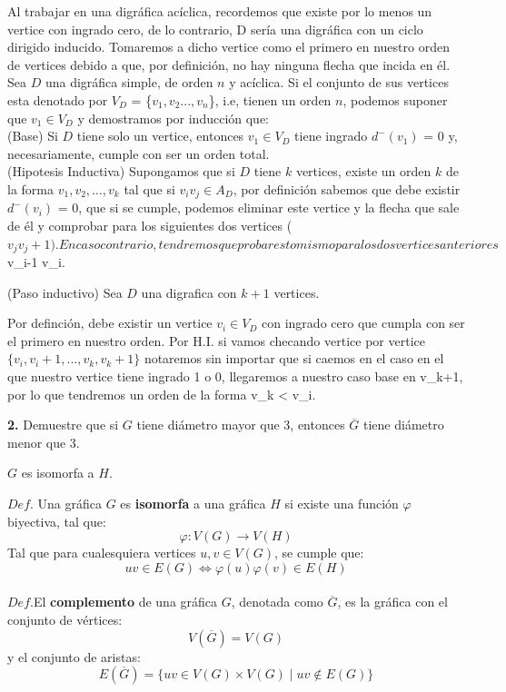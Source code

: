 \documentclass[12pt]{article}
\begin{document}
Al trabajar en una digráfica acíclica, recordemos que existe por lo menos un vertice con ingrado cero, 
de lo contrario, D sería una digráfica con un ciclo dirigido inducido. Tomaremos a dicho vertice como el primero en nuestro orden 
de vertices debido a que, por definición, no hay ninguna flecha que incida en él. \\

Sea $D$ una digráfica simple, de orden $n$ y acíclica. Si el conjunto de sus vertices esta denotado 
por $V_D$  = \{$v_1, v_2  . . . , v_n$\}, i.e, tienen un orden $n$, podemos suponer que  $v_1 \in V_D $
 y demostramos por inducción que:\\

(Base) Si $D$ tiene solo un vertice, entonces $v_1 \in V_D$ tiene ingrado $d^-(v_1)$ = 0 y, necesariamente, cumple con ser un orden total.\\

(Hipotesis Inductiva) Supongamos que si $D$ tiene $k$ vertices, existe un orden $k$ de la forma 
$v_1, v_2, \dots, v_k$ tal que si $v_i v_j \in A_D$, por definición sabemos que debe existir $d^-(v_i)$ = 0, que si se cumple, 
podemos eliminar este vertice y la flecha que sale de él y comprobar para los siguientes dos vertices ($v_j v_j+1). 
En caso contrario, tendremos que probar esto mismo para los dos vertices anteriores $v_i-1 v_i.

(Paso inductivo) Sea $D$ una digrafica con $k + 1$ vertices.

Por definción, debe existir un vertice $v_i \in V_D$ con ingrado cero que cumpla con ser el primero en nuestro orden. Por H.I.
si vamos checando vertice por vertice $\{v_i, v_i+1, ..., v_k, v_k+1\}$ notaremos sin importar que si caemos en el caso en el que nuestro vertice tiene ingrado 1 o 0, llegaremos a nuestro caso base en v_k+1,
por lo que tendremos un orden de la forma v_k < v_i. 



\vspace{1cm}

%
%
\textbf{2.} Demuestre que si $G$ tiene diámetro mayor que 3, entonces $\overline{G}$ tiene diámetro menor que 3.

\begin{tcolorbox}[title=\textbf{Hipotesis}, colback=red!15!white, colframe=black!, breakable]
    $G$ es isomorfa a $H$.
\end{tcolorbox}
\begin{tcolorbox}[title=\textbf{Definiciones}, colback=blue!15!white, colframe=black!, breakable]
    $Def$. Una gráfica $G$ es \textbf{isomorfa} a una gráfica $H$ si existe una función $\varphi$ biyectiva, tal que:
    \[\varphi: V(G) \rightarrow V(H)\]
    Tal que para cualesquiera vertices $u,v \in V(G)$, se cumple que:
    \[uv \in E(G) \Leftrightarrow \varphi(u)\varphi(v) \in E(H)\]
    \\
    $Def$.El \textbf{complemento} de una gráfica $G$, denotada como $\overline{G}$, es la gráfica con el conjunto de vértices:
    \[V(\overline{G}) = V(G)\]
    y el conjunto de aristas:
    \[E(\overline{G}) = \{ uv \in V(G) \times V(G) \mid uv \notin E(G)\}\]
\end{tcolorbox}
\end{document}
